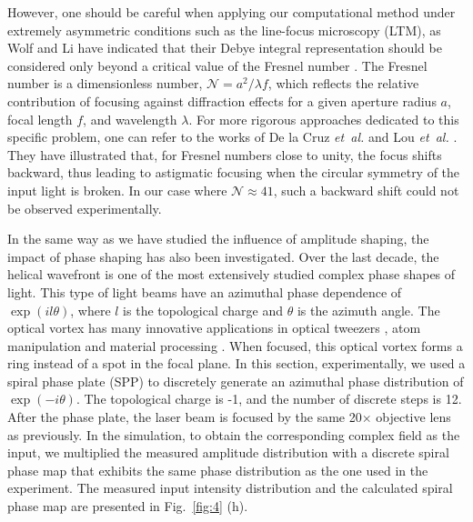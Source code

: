 \documentclass[9pt,twocolumn,twoside]{osajnl}
\begin{document}
However, one should be careful when applying our computational method under extremely asymmetric conditions such as the line-focus microscopy (LTM), as Wolf and Li have indicated that their Debye integral representation should be considered only beyond a critical value of the Fresnel number \cite{wolf1981conditions}. The Fresnel number is a dimensionless number, $\mathcal{N} = a^2/\lambda f$, which reflects the relative contribution of focusing against diffraction effects for a given aperture radius $a$, focal length $f$, and wavelength $\lambda$. For more rigorous approaches dedicated to this specific problem, one can refer to the works of De la Cruz \emph{et~al.} \cite{de2011modeling} and Lou \emph{et~al.} \cite{lou2018better}. They have illustrated that, for Fresnel numbers close to unity, the focus shifts backward, thus leading to astigmatic focusing when the circular symmetry of the input light is broken. In our case where $\mathcal{N}\approx 41$, such a backward shift could not be observed experimentally. %

In the same way as we have studied the influence of amplitude shaping, the impact of phase shaping has also been investigated. Over the last decade, the helical wavefront is one of the most extensively studied complex phase shapes of light. This type of light beams have an azimuthal phase dependence of $\exp(il\theta)$, where $l$ is the topological charge and $\theta$ is the azimuth angle. The optical vortex has many innovative applications in optical tweezers \cite{padgett2011tweezers}, atom manipulation \cite{ladavac2004microoptomechanical} and material processing \cite{hnatovsky2010materials}. When focused, this optical vortex forms a ring instead of a spot in the focal plane. In this section, experimentally, we used a spiral phase plate (SPP) to discretely generate an azimuthal phase distribution of $\exp(-i\theta)$. The topological charge is -1, and the number of discrete steps is 12. After the phase plate, the laser beam is focused by the same 20$\times$ objective lens as previously. In the simulation, to obtain the corresponding complex field as the input, we multiplied the measured amplitude distribution with a discrete spiral phase map that exhibits the same phase distribution as the one used in the experiment. The measured input intensity distribution and the calculated spiral phase map are presented in Fig.~\ref{fig:4} (h).
\end{document}
